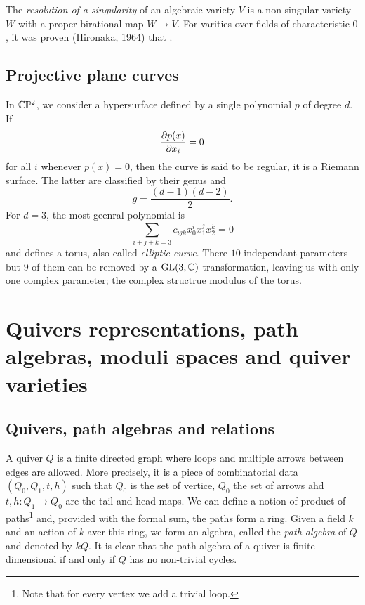         The \emph{resolution of a singularity} of an algebraic variety $V$ is a non-singular variety $W$ with a proper birational map $W\to V$. For varities over fields of characteristic $0$, it was proven (Hironaka, 1964) that \marker.

    \subsection{Projective plane curves}

        In $\mathbb{C}\mathbb{P}^2$, we consider a hypersurface defined by a single polynomial $p$ of degree $d$. If
        \begin{equation}
            \pdv{p(x)}{x_i}=0
        \end{equation}
        for all $i$ whenever $p(x)=0$, then the curve is said to be regular, it is a Riemann surface. The latter are classified by their genus and
        \begin{equation}
            g=\frac{(d-1)(d-2)}{2}.
        \end{equation}
        For $d=3$, the most geenral polynomial is
        \begin{equation}
            \sum_{i+j+k=3}c_{ijk}x^i_0x^j_1x^k_2=0
        \end{equation}
        and defines a torus, also called \emph{elliptic curve}. There $10$ independant parameters but $9$ of them can be removed by a $\text{GL}(3,\mathbb{C})$ transformation, leaving us with only one complex parameter; the complex structrue modulus of the torus.

\section{Quivers representations, path algebras, moduli spaces and quiver varieties}

    \subsection{Quivers, path algebras and relations}

        A quiver $Q$ is a finite directed graph where loops and multiple arrows between edges are allowed. More precisely, it is a piece of combinatorial data $(Q_0,Q_1,t,h)$ such that $Q_0$ is the set of vertice, $Q_0$ the set of arrows ahd $t,h:Q_1\to Q_0$ are the tail and head maps. We can define a notion of product of paths\footnote{Note that for every vertex we add a trivial loop.} and, provided with the formal sum, the paths form a ring. Given a field $k$ and an action of $k$ aver this ring, we form an algebra, called the \emph{path algebra} of $Q$ and denoted by $kQ$. It is clear that the path algebra of a quiver is finite-dimensional if and only if $Q$ has no non-trivial cycles.

